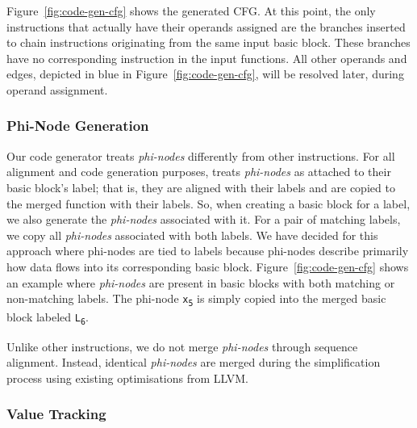 Figure~\ref{fig:code-gen-cfg} shows the generated CFG. At this point, the only
instructions that actually have their operands assigned are the branches inserted
to chain instructions originating from the same input basic block.
These branches have no corresponding instruction in the input functions.
All other operands and edges, depicted in blue in Figure~\ref{fig:code-gen-cfg},
will be resolved later, during operand assignment.

\subsubsection{Phi-Node Generation}

Our code generator treats \textit{phi-nodes} differently from other instructions. For all alignment and code generation purposes,
{\ProjName} treats \textit{phi-nodes} as attached to their basic block's label; that is, they are aligned with their labels and are
copied to the merged function with their labels. So, when creating a basic block for a label, we also generate the \textit{phi-nodes}
associated with it. For a pair of matching labels, we copy all \textit{phi-nodes} associated with both labels.
We have decided for this approach where phi-nodes are tied to labels because phi-nodes describe primarily how data flows into its corresponding basic block.
Figure~\ref{fig:code-gen-cfg} shows an example where \textit{phi-nodes} are present in basic blocks
with both matching or non-matching labels.
The phi-node \texttt{x\textsubscript{5}} is simply copied into the merged basic block labeled \texttt{L\textsubscript{6}}.

Unlike other instructions, we do not merge \textit{phi-nodes} through sequence alignment.
Instead, identical \textit{phi-nodes} are merged during the simplification process
using existing optimisations from LLVM.

\subsubsection{Value Tracking}

